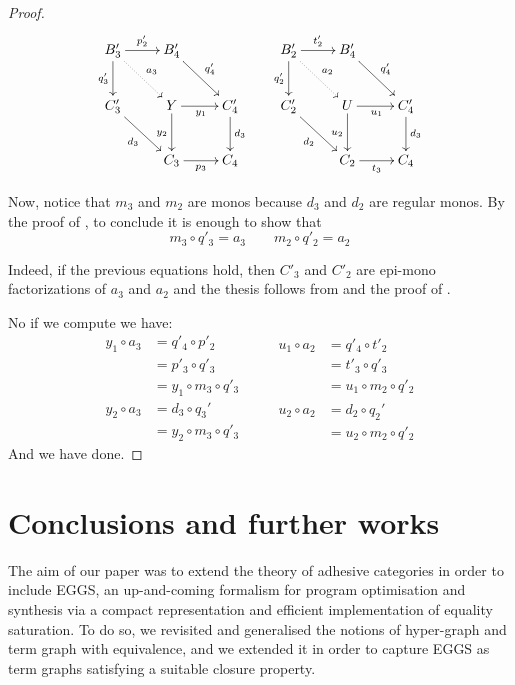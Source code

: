 \documentclass[a4paper,UKenglish,cleveref,pdftex,thm-restate,numberwithinsect]{lipics-v2021}
\def\C{\textbf {\textup{C}}}
\begin{document}
\begin{proof}
	\[\xymatrix{B'_3 \ar@{.>}[dr]^{a_3} \ar[r]^{p'_2} \ar[d]_{q'_3} &B'_4\ar[dr]^{q'_4}&& B'_2\ar@{.>}[dr]^{a_2} \ar[r]^{t'_2} \ar[d]_{q'_2} &B'_4\ar[dr]^{q'_4}\\C'_3 \ar[dr]_{d_3} &Y \ar[r]_{y_1} \ar[d]_{y_2}& C'_4\ar[d]^{d_3}&C_2' \ar[dr]_{d_2}& U \ar[d]_{u_2}\ar[r]_{u_1}& C'_4 \ar[d]^{d_3}\\&C_3 \ar[r]_{p_3}& C_4 &&C_2 \ar[r]_{t_3}& C_4 }\]
	
	Now, notice that  $m_3$ and $m_2$ are monos because $d_3$ and $d_2$ are regular monos. By the proof of , to conclude it is enough to show that
	\[m_3\circ q'_3 = a_3 \qquad m_2\circ q'_2=a_2\]
	
	Indeed, if the previous equations hold, then $C'_3$ and $C'_2$ are epi-mono factorizations of $a_3$ and $a_2$ and the thesis follows from  and the proof of .
	
	No if we compute we have:
	\[\begin{split}
		y_1\circ a_3&= q'_4\circ p'_2\\&=p'_3 \circ q'_3\\&=y_1\circ m_3\circ q'_3  
	\end{split}\qquad \begin{split}
		u_1\circ a_2&= q'_4\circ t'_2\\&=t'_3 \circ q'_3\\&=u_1\circ m_2\circ q'_2  
	\end{split}\]
	\[\begin{split}
		y_2\circ a_3&= d_3\circ q_3'\\&=y_2\circ m_3\circ q'_3
	\end{split}\qquad \begin{split}
		u_2\circ a_2&= d_2\circ q_2'\\&=u_2\circ m_2\circ q'_2
	\end{split}\]
	And we have done.
\end{proof} 


%






\section{Conclusions and further works}
The aim of our paper was to extend the theory of adhesive categories in order to include EGGS, 
an up-and-coming formalism for program optimisation and synthesis via a compact representation and 
efficient implementation of equality saturation.
%
To do so, we revisited and generalised the notions of hyper-graph and term graph with equivalence, and
we extended it in order to capture EGGS as term graphs satisfying a suitable closure property.
\end{document}
